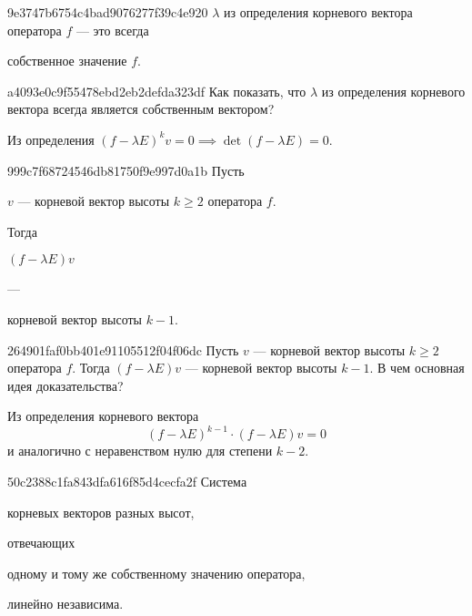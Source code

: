 \begin{note}{9e3747b6754c4bad9076277f39c4e920}
    \( \lambda \) из определения корневого вектора оператора \( f \) --- это всегда \begin{icloze}{1}собственное значение \( f \).\end{icloze}
\end{note}

\begin{note}{a4093e0c9f55478ebd2eb2defda323df}
    Как показать, что \( \lambda \) из определения корневого вектора всегда является собственным вектором?

    \begin{cloze}{1}
        Из определения \( (f - \lambda E)^{k} v = 0 \implies \det (f - \lambda E) = 0 \).
    \end{cloze}
\end{note}

\begin{note}{999c7f68724546db81750f9e997d0a1b}
    Пусть \begin{icloze}{3}\( v \) --- корневой вектор высоты \( k \geqslant 2 \) оператора \( f \).\end{icloze}
    Тогда \begin{icloze}{2}\( (f - \lambda E) v \)\end{icloze} --- \begin{icloze}{1}корневой вектор высоты \( k - 1 \).\end{icloze}
\end{note}

\begin{note}{264901faf0bb401e91105512f04f06dc}
    Пусть \( v \) --- корневой вектор высоты \( k \geqslant 2 \) оператора \( f \).
    Тогда \( (f - \lambda E) v \) --- корневой вектор высоты \( k - 1 \).
    В чем основная идея доказательства?

    \begin{cloze}{1}
        Из определения корневого вектора
        \[
            (f - \lambda E)^{k - 1} \cdot (f - \lambda E)v = 0
        \]
        и аналогично с неравенством нулю для степени \( k - 2 \).
    \end{cloze}
\end{note}

\begin{note}{50c2388c1fa843dfa616f85d4cecfa2f}
    Система \begin{icloze}{3}корневых векторов разных высот,\end{icloze} отвечающих \begin{icloze}{2}одному и тому же собственному значению оператора,\end{icloze} \begin{icloze}{1}линейно независима.\end{icloze}
\end{note}

